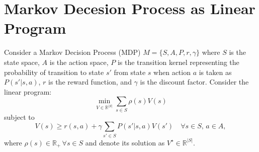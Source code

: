 \documentclass[a3paper,12pt]{extarticle} %
\begin{document}
\newpage


\newpage
\section{Markov Decesion Process as Linear Program}
Consider a Markov Decision Process (MDP) $M = \{S, A, P, r, \gamma\}$ where $S$ is the state space, $A$ is the action space, $P$ is the transition kernel representing the probability of transition to state $s'$ from state $s$ when action $a$ is taken as $P(s'|s, a)$, $r$ is the reward function, and $\gamma$ is the discount factor. Consider the linear program:
\[
\min_{V \in \mathbb{R}^{|S|}} \sum_{s \in S} \rho(s)V(s)
\]
subject to
\[
V(s) \geq r(s, a) + \gamma \sum_{s' \in S} P(s'|s, a)V(s') \quad \forall s \in S, \, a \in A,
\]
where $\rho(s) \in \mathbb{R}_+ \, \forall s \in S$ and denote its solution as $V^\star \in \mathbb{R}^{|S|}$.
\end{document}
